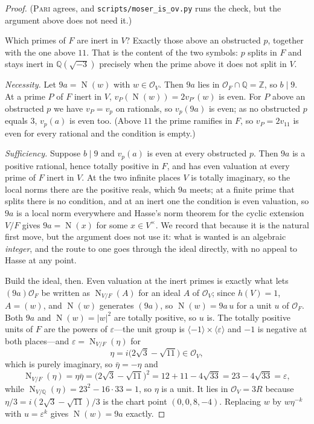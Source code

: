 \documentclass[11pt,reqno]{amsart}
\theoremstyle{plain}
\theoremstyle{definition}
\newcommand{\Z}{\mathbb{Z}}
\newcommand{\Q}{\mathbb{Q}}
\newcommand{\Lat}{R}
\newcommand{\Ok}{\mathcal{O}}
\DeclareMathOperator{\Nm}{N}
\begin{document}
\begin{proof}
(\textsc{Pari} agrees, and \texttt{scripts/moser\_is\_ov.py} runs the check, but
the argument above does not need it.)

Which primes of $F$ are inert in $V$? Exactly those above an obstructed $p$,
together with the one above $11$. That is the content of the two symbols: $p$
splits in $F$ and stays inert in $\Q(\sqrt{-3})$ precisely when the prime above it
does not split in $V$.

\emph{Necessity.} Let $9a = \Nm(w)$ with $w \in \Ok_V$. Then $9a$ lies in
$\Ok_F \cap \Q = \Z$, so $b \mid 9$. At a prime $P$ of $F$ inert in $V$,
$v_P(\Nm(w)) = 2v_{P'}(w)$ is even. For $P$ above an obstructed $p$ we have
$v_P = v_p$ on rationals, so $v_p(9a)$ is even; as no obstructed $p$ equals $3$,
$v_p(a)$ is even too. (Above $11$ the prime ramifies in $F$, so $v_P = 2v_{11}$ is
even for every rational and the condition is empty.)

\emph{Sufficiency.} Suppose $b \mid 9$ and $v_p(a)$ is even at every obstructed
$p$. Then $9a$ is a positive rational, hence totally positive in $F$, and has even
valuation at every prime of $F$ inert in $V$. At the two infinite places $V$ is
totally imaginary, so the local norms there are the positive reals, which $9a$
meets; at a finite prime that splits there is no condition, and at an inert one the
condition is even valuation, so $9a$ is a local norm everywhere and Hasse's norm
theorem for the cyclic extension $V/F$ gives $9a = \Nm(x)$ for some
$x \in V^\times$. We record that because it is the natural first move, but the
argument does not use it: what is wanted is an algebraic \emph{integer}, and the
route to one goes through the ideal directly, with no appeal to Hasse at any
point.

Build the ideal, then. Even valuation at the inert
primes is exactly what lets $(9a)\Ok_F$ be written as $\Nm_{V/F}(A)$ for an ideal
$A$ of $\Ok_V$; since $h(V) = 1$, $A = (w)$, and $\Nm(w)$ generates $(9a)$, so
$\Nm(w) = 9a\,u$ for a unit $u$ of $\Ok_F$. Both $9a$ and $\Nm(w) = \lvert w\rvert^2$
are totally positive, so $u$ is. The totally positive units of $F$ are the powers
of $\varepsilon$---the unit group is $\langle -1\rangle \times \langle
\varepsilon\rangle$ and $-1$ is negative at both places---and $\varepsilon = \Nm_{V/F}(\eta)$ for
\[
  \eta = i\bigl(2\sqrt3 - \sqrt{11}\bigr) \in \Ok_V,
\]
which is purely imaginary, so $\bar\eta = -\eta$ and
\[
  \Nm_{V/F}(\eta) = \eta\bar\eta = \bigl(2\sqrt3 - \sqrt{11}\bigr)^2
  = 12 + 11 - 4\sqrt{33} = 23 - 4\sqrt{33} = \varepsilon,
\]
while $\Nm_{V/\Q}(\eta) = 23^2 - 16\cdot 33 = 1$, so $\eta$ is a unit. It lies in
$\Ok_V = 3\Lat$ because $\eta/3 = i(2\sqrt3 - \sqrt{11})/3$ is the chart point
$(0,0,8,-4)$. Replacing $w$
by $w\eta^{-k}$ with $u = \varepsilon^{k}$ gives $\Nm(w) = 9a$ exactly.
\end{proof}
\end{document}
